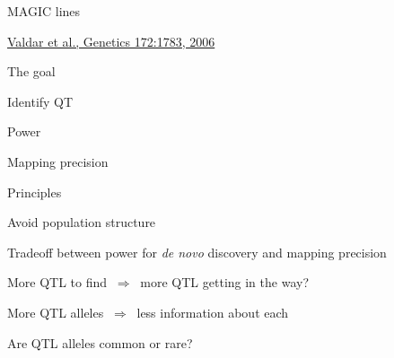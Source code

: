 \documentclass[12pt,t,aspectratio=169]{beamer}
\begin{document}
\begin{frame}{MAGIC lines}

 \vspace{5mm}


  \vspace{20mm}

\hfill {\footnotesize \href{http://www.genetics.org/content/172/3/1783.full}{\lolit Valdar et al., Genetics 172:1783, 2006}}






\end{frame}



\begin{frame}[c]{The goal}

Identify QT

\bbi

\item Power
\item Mapping precision

\ei

\end{frame}




\begin{frame}[c]{Principles}

\bbi

\item Avoid population structure
\item Tradeoff between {\hilit power for \emph{de novo\/} discovery}
  and {\hilit mapping precision}
\item More QTL to find $ \ \Rightarrow \ $ more QTL getting in the way?
\item More QTL alleles $ \ \Rightarrow \ $ less information about each
\item Are QTL alleles common or rare?

\ei

\end{frame}
\end{document}
